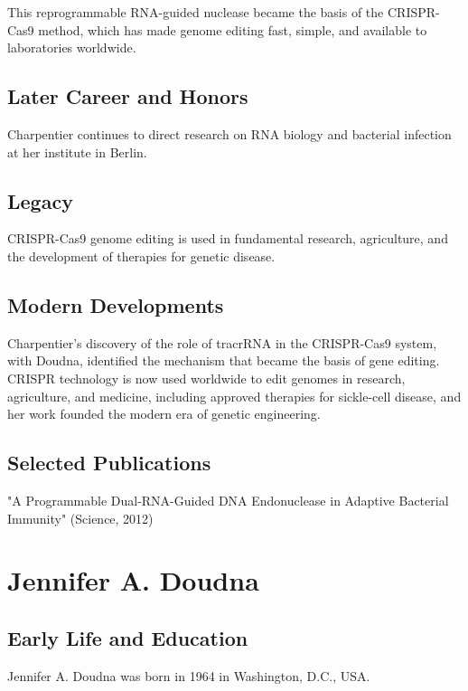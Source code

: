This reprogrammable RNA-guided nuclease became the basis of the CRISPR-Cas9 method, which has made genome editing fast, simple, and available to laboratories worldwide.

\subsection*{Later Career and Honors}

Charpentier continues to direct research on RNA biology and bacterial infection at her institute in Berlin.

\subsection*{Legacy}

CRISPR-Cas9 genome editing is used in fundamental research, agriculture, and the development of therapies for genetic disease.

\subsection*{Modern Developments}

Charpentier's discovery of the role of tracrRNA in the CRISPR-Cas9 system, with Doudna, identified the mechanism that became the basis of gene editing. CRISPR technology is now used worldwide to edit genomes in research, agriculture, and medicine, including approved therapies for sickle-cell disease, and her work founded the modern era of genetic engineering.

\subsection*{Selected Publications}

"A Programmable Dual-RNA-Guided DNA Endonuclease in Adaptive Bacterial Immunity" (Science, 2012)

\clearpage

\section{Jennifer A. Doudna}

\subsection*{Early Life and Education}

Jennifer A. Doudna was born in 1964 in Washington, D.C., USA.


